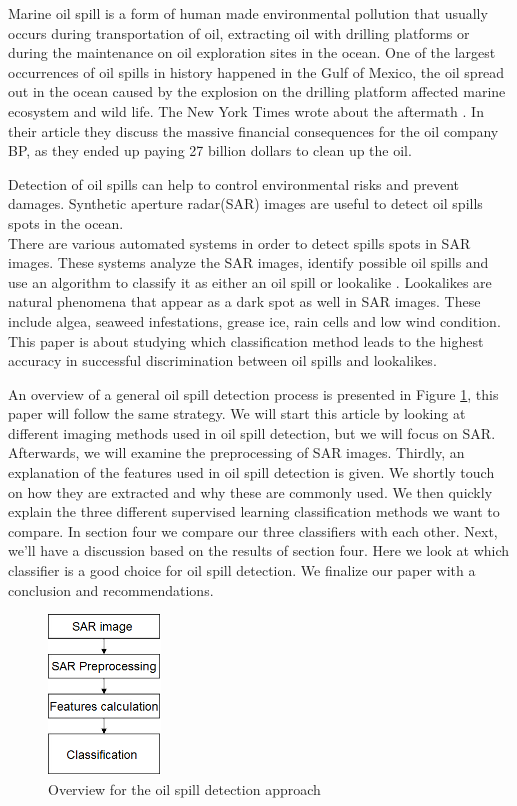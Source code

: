 Marine oil spill is a form of human made environmental pollution that usually occurs during transportation of oil, extracting oil with drilling platforms \cite{Zhang201476} or during the maintenance on oil exploration sites in the ocean. One of the largest occurrences of oil spills in history happened in the Gulf of Mexico, the oil spread out in the ocean caused by the explosion on the drilling platform affected marine ecosystem and wild life\cite{Bozeman2011244}. The New York Times wrote about the aftermath \cite{bpnytimes}. In their article they discuss the massive financial consequences for the oil company BP, as they ended up paying 27 billion dollars to clean up the oil.

Detection of oil spills can help to control environmental risks and prevent damages. Synthetic aperture radar(SAR) images are useful to detect oil spills spots in the ocean. \\
There are various automated systems in order to detect spills spots in SAR images. These systems analyze the SAR images, identify possible oil spills and use an algorithm to classify it as either an oil spill or lookalike \cite{Xu201414,brekke2008classifiers,Keramitsoglou2006640,Guo2014146}. Lookalikes are natural phenomena that appear as a dark spot as well in SAR images. These include algea, seaweed infestations, grease ice, rain cells and low wind condition. This paper is about studying which classification method leads to the highest accuracy in successful discrimination between oil spills and lookalikes.

An overview of a general oil spill detection process is presented in Figure \ref{fig:oilspillapproach}, this paper will follow the same strategy. We will start this article by looking at different imaging methods used in oil spill detection, but we will focus on SAR. Afterwards, we will examine the preprocessing of SAR images. Thirdly, an explanation of the features used in oil spill detection is given. We shortly touch on how they are extracted and why these are commonly used. We then quickly explain the three different supervised learning classification methods we want to compare. In section four we compare our three classifiers with each other. Next, we'll have a discussion based on the results of section four. Here we look at which classifier is a good choice for oil spill detection. We finalize our paper with a conclusion and recommendations.

\begin{figure}[H]
	\centering
    \includegraphics[width=30mm,scale=0.2]{./img/basicsteps.png}
    \caption{\footnotesize{Overview for the oil spill detection approach}}
    \label{fig:oilspillapproach}
\end{figure}

